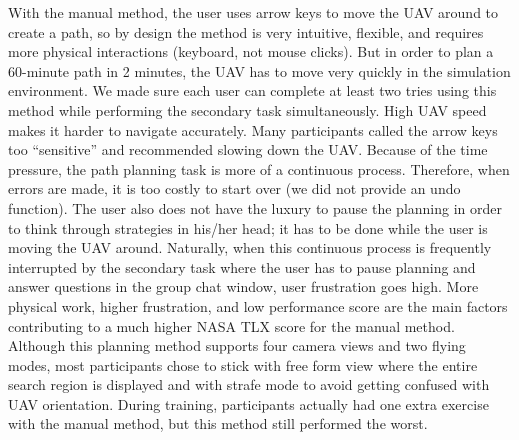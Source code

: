 \documentclass[journal]{IEEEtran}
\begin{document}
With the manual method, the user uses arrow keys to move the UAV around to create a path, so by design the method is very intuitive, flexible, and requires more physical interactions (keyboard, not mouse clicks). But in order to plan a 60-minute path in 2 minutes, the UAV has to move very quickly in the simulation environment. We made sure each user can complete at least two tries using this method while performing the secondary task simultaneously. High UAV speed makes it harder to navigate accurately. Many participants called the arrow keys too ``sensitive'' and recommended slowing down the UAV. Because of the time pressure, the path planning task is more of a continuous process. Therefore, when errors are made, it is too costly to start over (we did not provide an undo function). The user also does not have the luxury to pause the planning in order to think through strategies in his/her head; it has to be done while the user is moving the UAV around. Naturally, when this continuous process is frequently interrupted by the secondary task where the user has to pause planning and answer questions in the group chat window, user frustration goes high. More physical work, higher frustration, and low performance score are the main factors contributing to a much higher NASA TLX score for the manual method. Although this planning method supports four camera views and two flying modes, most participants chose to stick with free form view where the entire search region is displayed and with strafe mode to avoid getting confused with UAV orientation. During training, participants actually had one extra exercise with the manual method, but this method still performed the worst.
\end{document}
